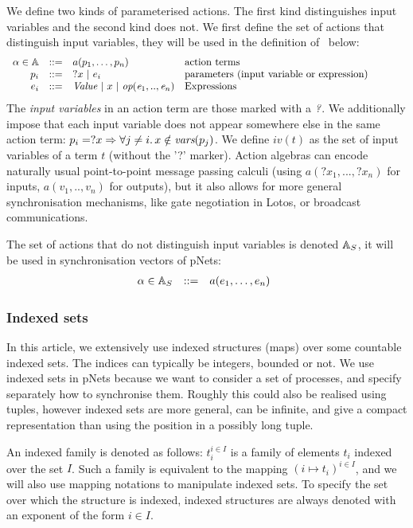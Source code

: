 \documentclass{lmcs}
\begin{document}
We define two kinds of parameterised actions. The first kind distinguishes input variables and the second kind does not. 
We first define the set of actions that distinguish input variables, they will be used in the definition of \pLTS\ below:
\[
\begin{array}[l]{rcl@{\quad}p{7.5cm}}
  \alpha\in\AlgA&::=&a(p_1,\ldots,p_n)&\text{action terms}\\
  p_i&::=& ?x~|~e_i&\text{parameters (input variable or expression)}\\
  e_i&::=& \symb{Value}~|~x~|~\symb{op}(\symb{e}_1,..,\symb{e}_n)&\text{Expressions}
\end{array}
\]
The \emph{input variables} in an action term are those marked with a
$\symb{?}$.
We additionally impose that each input variable does not
appear somewhere else in the same action term:
$p_i=?x\Rightarrow\forall j\neq i.\, x\notin \vars(p_j)$.
We define $iv(t)$  as the set of input variables of a term $t$ (without the '?' marker).
Action algebras can encode naturally usual point-to-point message passing calculi (using 
$a(?x_1,...,?x_n)$ for inputs, $a(v_1,..,v_n)$ for outputs), but it also allows
for more general synchronisation mechanisms, like gate negotiation in Lotos, or broadcast
communications. 

The set of actions that do not distinguish input variables is denoted $\mathbb{A}_S$, it will be used in synchronisation vectors of pNets:
\[\begin{array}[l]{rcl@{\quad}l}
  \alpha\in \AlgAS &::=&a(e_1,\ldots,e_n)
\end{array}
\]






\subsubsection*{Indexed sets}



In this article, we extensively use indexed structures 
(maps) over some countable indexed sets.   The indices can typically be
integers, bounded or not. We use indexed sets in pNets because we want to consider a set of processes, and specify separately how to synchronise them. Roughly this could also be realised using tuples, however indexed sets are more general, can be infinite, and give a compact representation than using the position in a possibly long tuple.

An indexed family is denoted as
follows: $t_i^{i\in I}$ is a family of elements $t_i$ indexed over the
set $I$. Such a family
is equivalent to the mapping $(i\mapsto t_i)^{i\in I}$, and we will also use mapping 
notations to manipulate indexed sets.
To specify the set over which the structure is indexed, 
indexed structures are always denoted with an exponent of the form $i\in I$.
\end{document}
